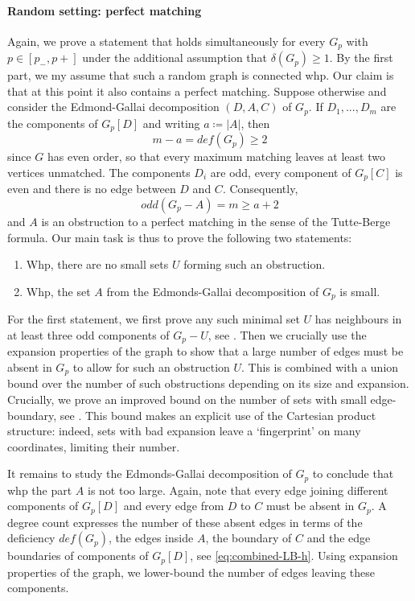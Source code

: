 \documentclass[notitlepage]{scrartcl}
\begin{document}
\paragraph{Random setting: perfect matching}

Again, we prove a statement that holds simultaneously for every $G_p$ with $p \in [p_-,p+]$ under the additional assumption that $\delta(G_p) \geq 1$. By the first part, we my assume that such a random graph is connected whp. Our claim is that at this point it also contains a perfect matching. Suppose otherwise and consider the Edmond-Gallai decomposition $(D, A, C)$ of $G_p$. If $D_1, ..., D_m$ are the components of $G_p[D]$ and writing $a\coloneqq |A|$, then
\[m-a = def(G_p) \geq 2\]
since $G$ has even order, so that every maximum matching leaves at least two vertices unmatched. The components $D_i$ are odd, every component of $G_p[C]$ is even and there is no edge between $D$ and $C$. Consequently,
\[odd(G_p-A)=m \geq a+2\]
and $A$ is an obstruction to a perfect matching in the sense of the Tutte-Berge formula. Our main task is thus to prove the following two statements:

\begin{enumerate}
    \item Whp, there are no small sets $U$ forming such an obstruction.
\item Whp, the set $A$ from the Edmonds-Gallai decomposition of $G_p$ is small.
\end{enumerate}

For the first statement, we first prove any such minimal set $U$ has neighbours in at least three odd components of $G_p-U$, see . Then we crucially use the expansion properties of the graph to show that a large number of edges must be absent in $G_p$ to allow for such an obstruction $U$. This is combined with a union bound over the number of such obstructions depending on its size and expansion. Crucially, we prove an improved bound on the number of sets with small edge-boundary, see . This bound makes an explicit use of the Cartesian product structure: indeed, sets with bad expansion leave a `fingerprint' on many coordinates, limiting their number.

It remains to study the Edmonds-Gallai decomposition of $G_p$ to conclude that whp the part $A$ is not too large. Again, note that every edge joining different components of $G_p [D]$ and every edge from $D$ to $C$ must be absent in $G_p$. A degree count expresses the number of these absent edges in terms of the deficiency $def(G_p)$, the edges inside $A$, the boundary of $C$ and the edge boundaries of components of $G_p[D]$, see \eqref{eq:combined-LB-h}. Using expansion properties of the graph, we lower-bound the number of edges leaving these components.
\end{document}

